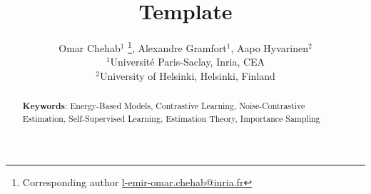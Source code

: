 \documentclass[11pt]{article}
\begin{document}
\title{Template}
\date{}

\author{
    Omar Chehab$^{1}$
    \footnote{
    Corresponding author \href{mailto:l-emir-omar.chehab@inria.fr}{l-emir-omar.chehab@inria.fr}},
    {Alexandre Gramfort}$^1$,
    {Aapo Hyvarinen}$^{2}$ \\ [.8em]
    $^1${Universit\'e Paris-Saclay, Inria, CEA} \\
    $^2$University of Helsinki, Helsinki, Finland \\
}

\maketitle

\begin{abstract}
    
    \noindent \textbf{Keywords}:
    Energy-Based Models, Contrastive Learning, Noise-Contrastive Estimation, Self-Supervised Learning, Estimation Theory, Importance Sampling
\end{abstract}













\vskip 0.2in



\newpage



\newpage

\end{document}
